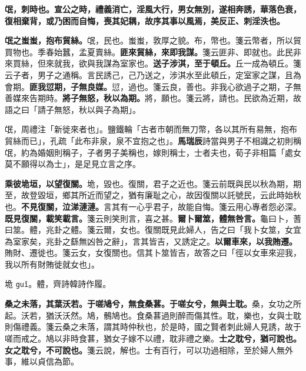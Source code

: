 
\textbf{氓，刺時也。宣公之時，禮義消亡，淫風大行，男女無別，遂相奔誘，華落色衰，復相棄背，或乃困而自悔，喪其妃耦，故序其事以風焉，美反正、刺淫泆也。}

\textbf{氓之蚩蚩，抱布貿絲。}{\footnotesize 氓，民也。蚩蚩，敦厚之貌。布，幣也。箋云幣者，所以貿買物也。季春始蠶，孟夏賣絲。}\textbf{匪來貿絲，來即我謀。}{\footnotesize 箋云匪非、即就也。此民非來買絲，但來就我，欲與我謀為室家也。}\textbf{送子涉淇，至于頓丘。}{\footnotesize 丘一成為頓丘。箋云子者，男子之通稱。言民誘己，己乃送之，涉淇水至此頓丘，定室家之謀，且為會期。}\textbf{匪我愆期，子無良媒。}{\footnotesize 愆，過也。箋云良，善也。非我心欲過子之期，子無善媒來告期時。}\textbf{將子無怒，秋以為期。}{\footnotesize 將，願也。箋云將，請也。民欲為近期，故語之曰「請子無怒，秋以與子為期」。}

\begin{quoting}氓，周禮注「新徙來者也」。鹽鐵輪「古者市朝而無刀幣，各以其所有易無，抱布貿絲而已」，孔疏「此布非泉，泉不宜抱之也」。\textbf{馬瑞辰}詩當與男子不相識之初則稱氓，約為婚姻則稱子，子者男子美稱也，嫁則稱士，士者夫也，荀子非相篇「處女莫不願得以為士」，是足見立言之序。\end{quoting}

\textbf{乘彼垝垣，以望復關。}{\footnotesize 垝，毀也。復關，君子之近也。箋云前既與民以秋為期，期至，故登毀垣，鄉其所近而望之，猶有廉耻之心，故因復關以託號民，云此時始秋也。}\textbf{不見復關，泣涕漣漣。}{\footnotesize 言其有一心乎君子，故能自悔。箋云用心專者怨必深。}\textbf{既見復關，載笑載言。}{\footnotesize 箋云則笑則言，喜之甚。}\textbf{爾卜爾筮，體無咎言。}{\footnotesize 龜曰卜，蓍曰筮。體，兆卦之體。箋云爾，女也。復關既見此婦人，告之曰「我卜女筮，女宜為室家矣，兆卦之繇無凶咎之辭」，言其皆吉，又誘定之。}\textbf{以爾車來，以我賄遷。}{\footnotesize 賄財、遷徙也。箋云女，女復關也。信其卜筮皆吉，故答之曰「徑以女車來迎我，我以所有財賄徙就女也」。}

\begin{quoting}垝 \texttt{guǐ}。體，齊詩韓詩作履。\end{quoting}

\textbf{桑之未落，其葉沃若。于嗟鳩兮，無食桑葚。于嗟女兮，無與士耽。}{\footnotesize 桑，女功之所起。沃若，猶沃沃然。鳩，鶻鳩也。食桑葚過則醉而傷其性。耽，樂也，女與士耽則傷禮義。箋云桑之未落，謂其時仲秋也，於是時，國之賢者刺此婦人見誘，故于嗟而戒之。鳩以非時食葚，猶女子嫁不以禮，耽非禮之樂。}\textbf{士之耽兮，猶可說也。女之耽兮，不可說也。}{\footnotesize 箋云說，解也。士有百行，可以功過相除，至於婦人無外事，維以貞信為節。}

